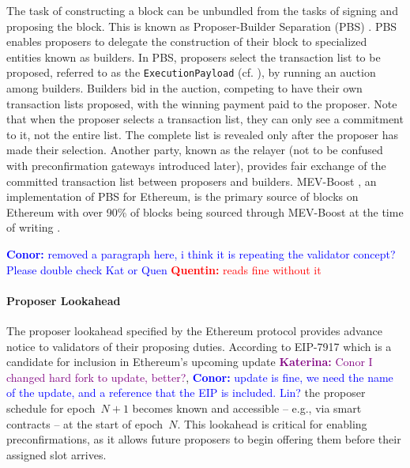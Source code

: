 \documentclass[a4paper]{article}
\theoremstyle{boldstyle}
\newcommand{\cm}[1]{\textcolor{blue}{\textbf{Conor:} #1}}
\newcommand{\qb}[1]{\textcolor{red}{\textbf{Quentin:} #1}}
\newcommand{\ks}[1]{\textcolor{purple}{\textbf{Katerina:} #1}}
\begin{document}
The task of constructing a block can be unbundled from the tasks of signing and proposing the block. This is known as Proposer-Builder Separation (PBS) \cite{W:Proposer-builderseparation}. PBS enables proposers to delegate the construction of their block to specialized entities known as builders.  
In PBS, proposers select the transaction list to be proposed, referred to as the \texttt{ExecutionPayload} (cf. \cite{W:TheMerge--TheBeaconChain}), by running an auction among builders. Builders bid in the auction, competing to have their own transaction lists proposed, with the winning payment paid to the proposer. Note that when the proposer selects a transaction list, they can only see a commitment to it, not the entire list. The complete list is revealed only after the proposer has made their selection. Another party, known as the relayer (not to be confused with preconfirmation gateways introduced later), provides fair exchange \cite{P:Fairexchangewithasemi-trustedthirdparty} of the committed transaction list between proposers and builders. MEV-Boost \cite{MEV-Boost}, an implementation of PBS for Ethereum, is the primary source of blocks on Ethereum with over 90\% of blocks being sourced through MEV-Boost at the time of writing \cite{MEV.pics}.  \par
\cm{removed a paragraph here, i think it is repeating the validator concept? Please double check Kat or Quen} \qb{reads fine without it}
    \paragraph{Proposer Lookahead}
        The proposer lookahead specified by the Ethereum protocol provides advance notice to validators of their proposing duties.
        According to EIP-7917 \cite{EIP7917} which is a candidate for inclusion in Ethereum’s upcoming update \ks{Conor I changed hard fork to update, better?}, \cm{update is fine, we need the name of the update, and a reference that the EIP is included. Lin?} the proposer schedule for epoch~$N+1$ becomes known and accessible -- e.g., via smart contracts -- at the start of epoch~$N$. %
        This lookahead is critical for enabling preconfirmations, as it allows future proposers to begin offering them before their assigned slot arrives. \\
\end{document}
